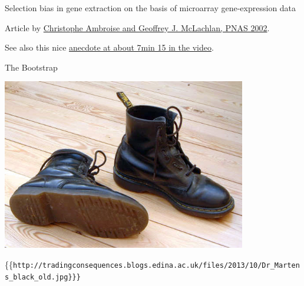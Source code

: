 \documentclass[
  10pt,
  ignorenonframetext,
]{beamer}
\begin{document}
\begin{frame}
\begin{block}{Selection bias in gene extraction on the basis of
microarray gene-expression data}
\protect\hypertarget{selection-bias-in-gene-extraction-on-the-basis-of-microarray-gene-expression-data}{}
\vspace{2mm}

Article by \href{http://www.pnas.org/content/99/10/6562}{Christophe
Ambroise and Geoffrey J. McLachlan, PNAS 2002}.

\vspace{10mm}

See also this nice
\href{https://www.youtube.com/watch?v=r64tRyHFAJ8\&list=PLAOUn-KLSAVNz3lv4a957qRpfPWH2EOg4\&index=3}{anecdote
at about 7min 15 in the video}.
\end{block}
\end{frame}

\begin{frame}{The Bootstrap}
\protect\hypertarget{the-bootstrap}{}
\centering

\includegraphics[width=0.8\textwidth,height=\textheight]{Dr_Martens_black_old}

\tiny\{\{\tt http://tradingconsequences.blogs.edina.ac.uk/files/2013/10/Dr\_Martens\_black\_old.jpg\}\}\}
\end{frame}
\end{document}
